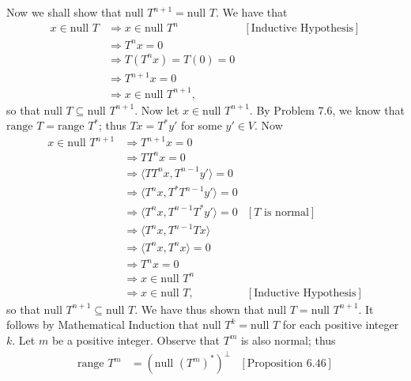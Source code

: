 \documentclass[9pt]{article}
\newcommand{\cyc}[1]{\langle #1 \rangle}
\begin{document}
\begin{enumerate}
      Now we shall show that $\text{null } T^{n+1} = \text{null }T$. We have 
      that
      \begin{align*}
         x \in \text{null }T &\Longrightarrow x \in \text{null }T^n
                  &[\text{Inductive Hypothesis}] \\
                  &\Longrightarrow T^nx = 0 \\
                  &\Longrightarrow T(T^nx) = T(0) = 0 \\
                  &\Longrightarrow T^{n+1}x = 0 \\
                  &\Longrightarrow x \in \text{null }T^{n+1},
      \end{align*}
      so that $\text{null } T \subseteq \text{null } T^{n+1}$. Now let
      $x \in \text{null }T^{n+1}$. By Problem 7.6, we know that
      $\text{range } T = \text{range } T^*$; thus $Tx = T^*y'$ for some
      $y' \in V$. Now
      \begin{align*}
         x \in \text{null }T^{n+1} &\Longrightarrow T^{n+1}x = 0 \\
                  &\Longrightarrow TT^nx = 0 \\
                  &\Longrightarrow \cyc{TT^nx, T^{n-1}y'} = 0 \\
                  &\Longrightarrow \cyc{T^nx, T^*T^{n-1}y'} = 0 \\
                  &\Longrightarrow \cyc{T^nx, T^{n-1}T^*y'} = 0
                  &[T\text{ is normal}] \\
                  &\Longrightarrow \cyc{T^nx, T^{n-1}Tx} \\
                  &\Longrightarrow \cyc{T^nx, T^nx} = 0 \\
                  &\Longrightarrow T^nx = 0 \\
                  &\Longrightarrow x \in \text{null }T^n \\
                  &\Longrightarrow x \in \text{null }T,
                  &[\text{Inductive Hypothesis}]
      \end{align*}
      so that $\text{null } T^{n+1} \subseteq \text{null } T$. We have thus 
      shown that $\text{null } T = \text{null } T^{n+1}$. It follows by
      Mathematical Induction that $\text{null } T^k = \text{null } T$ for each
      positive integer $k$. Let $m$ be a positive integer. Observe that $T^m$ is
      also normal; thus
      \begin{align*}
         \text{range }T^m &= (\text{null }(T^m)^*)^\perp
            &[\text{Proposition }6.46] \\

\end{align*}
\end{enumerate}
\end{document}
